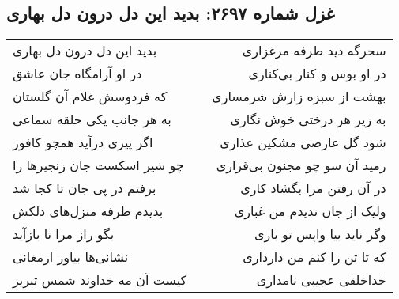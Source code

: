 \begin{center}
\section*{غزل شماره ۲۶۹۷: بدید این دل درون دل بهاری}
\label{sec:2697}
\begin{longtable}{l p{0.5cm} r}
بدید این دل درون دل بهاری
&&
سحرگه دید طرفه مرغزاری
\\
در او آرامگاه جان عاشق
&&
در او بوس و کنار بی‌کناری
\\
که فردوسش غلام آن گلستان
&&
بهشت از سبزه زارش شرمساری
\\
به هر جانب یکی حلقه سماعی
&&
به زیر هر درختی خوش نگاری
\\
اگر پیری درآید همچو کافور
&&
شود گل عارضی مشکین عذاری
\\
چو شیر اسکست جان زنجیرها را
&&
رمید آن سو چو مجنون بی‌قراری
\\
برفتم در پی جان تا کجا شد
&&
در آن رفتن مرا بگشاد کاری
\\
بدیدم طرفه منزل‌های دلکش
&&
ولیک از جان ندیدم من غباری
\\
بگو راز مرا تا بازآید
&&
وگر ناید بیا واپس تو باری
\\
نشانی‌ها بیاور ارمغانی
&&
که تا تن را کنم من دارداری
\\
کیست آن مه خداوند شمس تبریز
&&
خداخلقی عجیبی نامداری
\\
\end{longtable}
\end{center}
